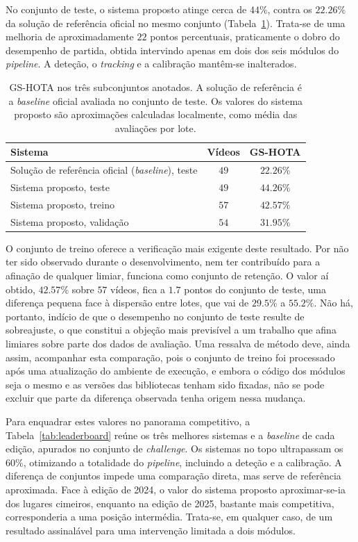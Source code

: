 No conjunto de teste, o sistema proposto atinge cerca de $44\%$, contra os $22.26\%$ da
solução de referência oficial no mesmo conjunto (Tabela~\ref{tab:gshota}). Trata-se de uma
melhoria de aproximadamente $22$ pontos percentuais, praticamente o dobro do desempenho de
partida, obtida intervindo apenas em dois dos seis módulos do \emph{pipeline}. A deteção, o
\emph{tracking} e a calibração mantêm-se inalterados.

\begin{table}[htbp]
    \centering
    \caption{GS-HOTA nos três subconjuntos anotados. A solução de referência é a
    \emph{baseline} oficial avaliada no conjunto de teste. Os valores do sistema proposto são
    aproximações calculadas localmente, como média das avaliações por lote.}
    \label{tab:gshota}
    \begin{tabular}{lcc}
        \hline
        \textbf{Sistema} & \textbf{Vídeos} & \textbf{GS-HOTA} \\
        \hline
        Solução de referência oficial (\emph{baseline}), teste & $49$ & $22.26\%$ \\
        \hline
        Sistema proposto, teste     & $49$ & $44.26\%$ \\
        Sistema proposto, treino    & $57$ & $42.57\%$ \\
        Sistema proposto, validação & $54$ & $31.95\%$ \\
        \hline
    \end{tabular}
\end{table}

O conjunto de treino oferece a verificação mais exigente deste resultado. Por não ter sido
observado durante o desenvolvimento, nem ter contribuído para a afinação de qualquer limiar,
funciona como conjunto de retenção. O valor aí obtido, $42.57\%$ sobre $57$ vídeos, fica a
$1.7$ pontos do conjunto de teste, uma diferença pequena face à dispersão entre lotes, que
vai de $29.5\%$ a $55.2\%$. Não há, portanto, indício de que o desempenho no conjunto de
teste resulte de sobreajuste, o que constitui a objeção mais previsível a um trabalho que
afina limiares sobre parte dos dados de avaliação. Uma ressalva de método deve, ainda assim,
acompanhar esta comparação, pois o conjunto de treino foi processado após uma atualização do
ambiente de execução, e embora o código dos módulos seja o mesmo e as versões das bibliotecas
tenham sido fixadas, não se pode excluir que parte da diferença observada tenha origem nessa
mudança.

Para enquadrar estes valores no panorama competitivo, a Tabela~\ref{tab:leaderboard} reúne os
três melhores sistemas e a \emph{baseline} de cada edição, apurados no conjunto de
\emph{challenge}. Os sistemas no topo ultrapassam os $60\%$, otimizando a totalidade do
\emph{pipeline}, incluindo a deteção e a calibração. A diferença de conjuntos impede uma
comparação direta, mas serve de referência aproximada. Face à edição de 2024, o valor do
sistema proposto aproximar-se-ia dos lugares cimeiros, enquanto na edição de 2025, bastante
mais competitiva, corresponderia a uma posição intermédia. Trata-se, em qualquer caso, de um
resultado assinalável para uma intervenção limitada a dois módulos.

